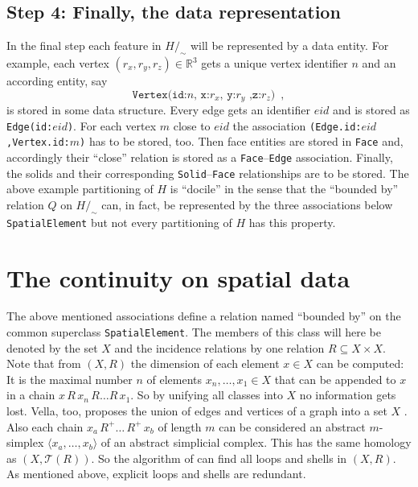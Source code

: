 \documentclass[5p]{elsarticle}
\newcommand{\qq}[1]{``#1''}
\begin{document}
\subsection{Step 4: Finally, the data representation}

In the final step each feature in $H/_{\!\sim}$ will be represented by a data entity. 
For example, each vertex $(r_x,r_y,r_z)\in \mathbb{R}^3$ gets a unique vertex identifier 
$n$ and an according entity, say 
$$
   \texttt{Vertex(id:$n$, x:$r_x$, y:$r_y$ ,z:$r_z$)}\enspace,
$$
is stored in some data structure. 
Every edge gets an identifier $\mathit{eid}$ and is stored as 
\texttt{Edge(id:$\mathit{eid}$)}. For each vertex $m$ close to $\mathit{eid}$ the association 
\texttt{(Edge.id:$eid$,Vertex.id:$m$)} has to be stored, too.
Then face entities are stored in \texttt{Face} and, accordingly their \qq{close} 
relation is stored as a \texttt{Face}--\texttt{Edge} association. Finally, the 
solids and their corresponding \texttt{Solid}--\texttt{Face} relationships are to be stored. 
The above example partitioning of $H$ is \qq{docile} in the sense that the \qq{bounded by} 
relation $Q$ on $H/_{\!\sim}$ can, in fact, be represented by the three 
associations below \texttt{Spa\-tial\-Ele\-ment} but not every partitioning of $H$ has 
this property. 

\section{The continuity on spatial data}\label{sec:data-topology}

The above mentioned associations define a relation named 
\qq{bounded by} on the common superclass 
\texttt{Spa\-tial\-Ele\-ment}. The members of this class will here be denoted by the set $X$ 
and the incidence relations by one relation $R\subseteq X\times X$. 
Note that from $(X,R)$ the dimension of each element 
$x\in X$ can be computed: 
It is the maximal number $n$ of elements $x_n,\dotsc,x_1\in X$ 
that can be appended to $x$ in a chain $x\,R\,x_n\,R\dotsc R\,x_1$. 
So by unifying all classes into $X$ no information gets lost. 
Vella, too, proposes the union of edges and vertices of a graph into a set 
$X$ \cite{Vella:GraphTheoryIsTopology}. 
Also each chain $x_a\,R^{+}\dotsc\,R^{+}\,x_b$ of length $m$ can be considered an abstract 
$m$-simplex $\langle x_a,\dotsc, x_b\rangle$ of an abstract simplicial complex. This has the 
same homology as $(X,\mathcal{T}(R))$. So the algorithm of \cite{Boltcheva:Homology} can find 
all loops and shells in $(X,R)$. As mentioned above, explicit loops and shells are 
redundant. 
\end{document}
